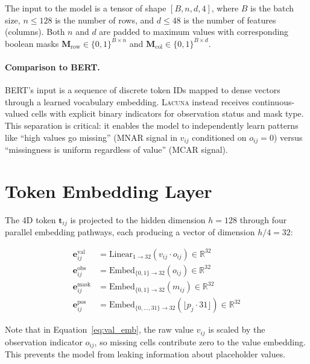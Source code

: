\documentclass[11pt]{article}
\newcommand{\RR}{\mathbb{R}}
\newcommand{\lacuna}{\textsc{Lacuna}}
\begin{document}
The input to the model is a tensor of shape $[B, n, d, 4]$, where $B$ is the batch size, $n \leq 128$ is the number of rows, and $d \leq 48$ is the number of features (columns). Both $n$ and $d$ are padded to maximum values with corresponding boolean masks $\mathbf{M}_{\text{row}} \in \{0,1\}^{B \times n}$ and $\mathbf{M}_{\text{col}} \in \{0,1\}^{B \times d}$.

\paragraph{Comparison to BERT.} BERT's input is a sequence of discrete token IDs mapped to dense vectors through a learned vocabulary embedding. \lacuna{} instead receives continuous-valued cells with explicit binary indicators for observation status and mask type. This separation is critical: it enables the model to independently learn patterns like ``high values go missing'' (MNAR signal in $v_{ij}$ conditioned on $o_{ij} = 0$) versus ``missingness is uniform regardless of value'' (MCAR signal).

\section{Token Embedding Layer}
\label{sec:embedding}

The 4D token $\mathbf{t}_{ij}$ is projected to the hidden dimension $h = 128$ through four parallel embedding pathways, each producing a vector of dimension $h/4 = 32$:

\begin{align}
\mathbf{e}^{\text{val}}_{ij} &= \text{Linear}_{1 \to 32}\!\left(v_{ij} \cdot o_{ij}\right) \in \RR^{32} \label{eq:val_emb} \\
\mathbf{e}^{\text{obs}}_{ij} &= \text{Embed}_{\{0,1\} \to 32}\!\left(o_{ij}\right) \in \RR^{32} \label{eq:obs_emb} \\
\mathbf{e}^{\text{mask}}_{ij} &= \text{Embed}_{\{0,1\} \to 32}\!\left(m_{ij}\right) \in \RR^{32} \label{eq:mask_emb} \\
\mathbf{e}^{\text{pos}}_{ij} &= \text{Embed}_{\{0,\ldots,31\} \to 32}\!\left(\lfloor p_j \cdot 31 \rfloor\right) \in \RR^{32} \label{eq:pos_emb}
\end{align}

Note that in Equation~\eqref{eq:val_emb}, the raw value $v_{ij}$ is scaled by the observation indicator $o_{ij}$, so missing cells contribute zero to the value embedding. This prevents the model from leaking information about placeholder values.
\end{document}
